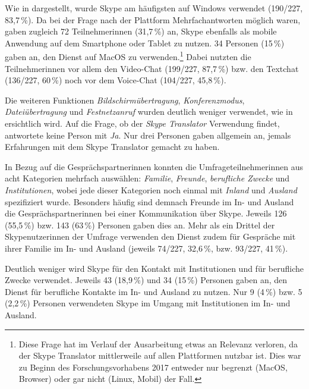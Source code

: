 Wie in  dargestellt, wurde Skype am häufigsten auf Windows verwendet (190/227, 83,7\,\%). Da bei der Frage nach der Plattform Mehrfachantworten möglich waren, gaben zugleich 72 Teilnehmer{\textperiodcentered}innen (31,7\,\%) an, Skype ebenfalls als mobile Anwendung auf dem Smartphone oder Tablet zu nutzen. 34 Personen (15\,\%) gaben an, den Dienst auf MacOS zu verwenden.\footnote{Diese Frage hat im Verlauf der Ausarbeitung etwas an Relevanz verloren, da der Skype Translator mittlerweile auf allen Plattformen nutzbar ist. Dies war zu Beginn des Forschungsvorhabens 2017 entweder nur begrenzt (MacOS, Browser) oder gar nicht (Linux, Mobil) der Fall.} Dabei nutzten die Teilnehmer{\textperiodcentered}innen vor allem den Video-Chat (199/227, 87,7\,\%) bzw. den Textchat (136/227, 60\,\%) noch vor dem Voice-Chat (104/227, 45,8\,\%).

Die weiteren Funktionen \emph{Bildschirmübertragung}, \emph{Konferenzmodus}, \emph{Dateiübertragung} und \emph{Festnetzanruf} wurden deutlich weniger verwendet, wie in  ersichtlich wird. Auf die Frage, ob der \emph{Skype Translator} Verwendung findet, antwortete keine Person mit \emph{Ja}.  Nur drei Personen gaben allgemein an, jemals Erfahrungen mit dem Skype Translator gemacht zu haben.

\begin{sloppypar}
In Bezug auf die Gesprächspartner{\textperiodcentered}innen konnten die Umfrageteilnehmer{\textperiodcentered}\linebreak[3]innen aus acht Kategorien mehrfach auswählen: \emph{Familie}, \emph{Freunde}, \emph{berufliche Zwecke} und \emph{Institutionen}, wobei jede dieser Kategorien noch einmal mit \emph{Inland} und \emph{Ausland} spezifiziert wurde. Besonders häufig sind demnach Freunde im In- und Ausland die Gesprächspartner{\textperiodcentered}innen bei einer Kommunikation über Skype. Jeweils 126 (55,5\,\%) bzw. 143 (63\,\%) Personen gaben dies an. Mehr als ein Drittel der Skypenutzer{\textperiodcentered}innen der Umfrage verwenden den Dienst zudem für Gespräche mit ihrer Familie im In- und Ausland (jeweils 74/227, 32,6\,\%, bzw. 93/227, 41\,\%).
\end{sloppypar}

Deutlich weniger wird Skype für den Kontakt mit Institutionen und für berufliche Zwecke verwendet. Jeweils 43 (18,9\,\%) und 34 (15\,\%) Personen gaben an, den Dienst für berufliche Kontakte im In- und Ausland zu nutzen. Nur 9 (4\,\%) bzw. 5 (2,2\,\%) Personen verwendeten Skype im Umgang mit Institutionen im In- und Ausland.


